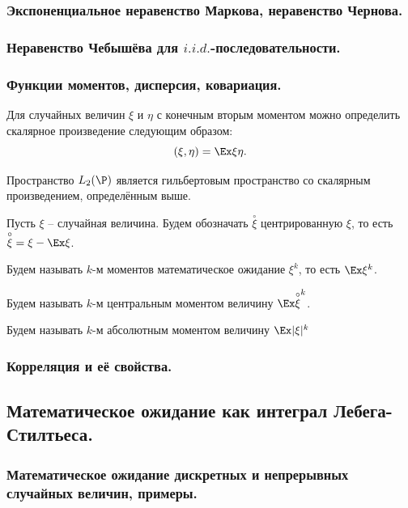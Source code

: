 \subsubsection{Экспоненциальное неравенство Маркова, неравенство Чернова.}

\subsubsection{Неравенство Чебышёва для $i.i.d.$-последовательности.}

\subsubsection{Функции моментов, дисперсия, ковариация.}
\begin{definition}
    Для случайных величин $\xi$ и $\eta$ с конечным вторым моментом можно определить скалярное произведение следующим образом:
    \[
        (\xi, \eta) = \Ex \xi \eta.
    \]
\end{definition}
\begin{reminder}
    Пространство $L_2(\P)$ является гильбертовым пространство со скалярным произведением, определённым выше.
\end{reminder}
\begin{definition}
    Пусть $\xi$ -- случайная величина.
    Будем обозначать $\overset{\circ}{\xi}$ центрированную $\xi$, то есть $\overset{\circ}{\xi} = \xi - \Ex \xi$.
\end{definition}
\begin{definition}
    Будем называть $k$-м моментов математическое ожидание $\xi^k$, то есть $\Ex \xi^k$.
\end{definition}
\begin{definition}
    Будем называть $k$-м центральным моментом величину $\Ex \overset{\circ}{\xi} ^k$.
\end{definition}
\begin{definition}
    Будем называть $k$-м абсолютным моментом величину $\Ex |\xi|^k$
\end{definition}
\subsubsection{Корреляция и её свойства.}
\subsection{Математическое ожидание как интеграл Лебега-Стилтьеса.}
\subsubsection{Математическое ожидание дискретных и непрерывных случайных величин, примеры.}
